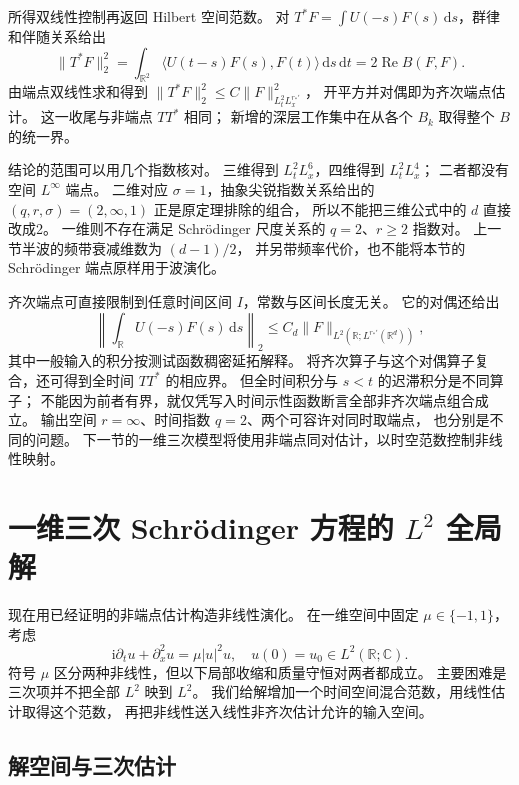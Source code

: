 \ProseParagraphBreak
所得双线性控制再返回 Hilbert 空间范数。
对 \(T^*F=\int U(-s)F(s)\,\mathrm ds\)，群律和伴随关系给出
\[
 \|T^*F\|_2^2
 =\int_{\mathbb R^2}
       \langle U(t-s)F(s),F(t)\rangle\,\mathrm ds\,\mathrm dt
 =2\operatorname{Re}B(F,F).
\]
由端点双线性求和得到
\(\|T^*F\|_2^2\le C\|F\|_{L^2_tL^{r_*'}_x}^2\)，
开平方并对偶即为齐次端点估计。
这一收尾与非端点 \(TT^*\) 相同；
新增的深层工作集中在从各个 \(B_k\) 取得整个 \(B\) 的统一界。

\ProseParagraphBreak
结论的范围可以用几个指数核对。
三维得到 \(L^2_tL^6_x\)，四维得到 \(L^2_tL^4_x\)；
二者都没有空间 \(L^\infty\) 端点。
二维对应 \(\sigma=1\)，抽象尖锐指数关系给出的
\((q,r,\sigma)=(2,\infty,1)\) 正是原定理排除的组合，
所以不能把三维公式中的 \(d\) 直接改成2。
一维则不存在满足 Schrödinger 尺度关系的 \(q=2\)、\(r\ge2\) 指数对。
上一节半波的频带衰减维数为 \((d-1)/2\)，
并另带频率代价，也不能将本节的 Schrödinger 端点原样用于波演化。

\ProseParagraphBreak
齐次端点可直接限制到任意时间区间 \(I\)，常数与区间长度无关。
它的对偶还给出
\[
 \left\|\int_{\mathbb R}U(-s)F(s)\,\mathrm ds\right\|_2
 \le C_d\|F\|_{L^2(\mathbb R;L^{r_*'}(\mathbb R^d))},
\]
其中一般输入的积分按测试函数稠密延拓解释。
将齐次算子与这个对偶算子复合，还可得到全时间 \(TT^*\) 的相应界。
但全时间积分与 \(s<t\) 的迟滞积分是不同算子；
不能因为前者有界，就仅凭写入时间示性函数断言全部非齐次端点组合成立。
输出空间 \(r=\infty\)、时间指数 \(q=2\)、两个可容许对同时取端点，
也分别是不同的问题。
下一节的一维三次模型将使用非端点同对估计，以时空范数控制非线性映射。

\section{一维三次 Schrödinger 方程的 \texorpdfstring{\(L^2\)}{L²} 全局解}

\label{b2:sec:app-E-5}

现在用已经证明的非端点估计构造非线性演化。
在一维空间中固定 \(\mu\in\{-1,1\}\)，考虑
\[
 \mathrm i\partial_tu+\partial_x^2u=\mu|u|^2u,
 \quad u(0)=u_0\in L^2(\mathbb R;\mathbb C).
\]
符号 \(\mu\) 区分两种非线性，但以下局部收缩和质量守恒对两者都成立。
主要困难是三次项并不把全部 \(L^2\) 映到 \(L^2\)。
我们给解增加一个时间空间混合范数，用线性估计取得这个范数，
再把非线性送入线性非齐次估计允许的输入空间。

\subsection{解空间与三次估计}
\label{b2:subsec:E-cubic-space}

